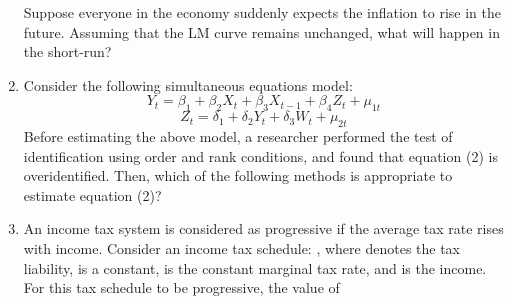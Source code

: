 \documentclass[12pt]{article}
\theoremstyle{remark}
\begin{document}
\begin{enumerate}
Suppose everyone in the economy suddenly expects the inflation to rise in the future. Assuming that the LM curve remains unchanged, what will happen in the short-run? \\
\begin{enumerate}  \end{enumerate}
\hfill{}
\item Consider the following simultaneous equations model:
$$
Y_t = \beta_1 + \beta_2 X_t + \beta_3 X_{t-1} + \beta_4 Z_t + \mu_{1t} 
$$
$$
Z_t = \delta_1 + \delta_2 Y_t + \delta_3 W_t + \mu_{2t} 
$$
Before estimating the above model, a researcher performed the test of identification using order and rank conditions, and found that equation (2) is overidentified. Then, which of the following methods is appropriate to estimate equation (2)? \\
\begin{enumerate}  \end{enumerate}
\hfill{}
\item  An income tax system is considered as progressive if the average tax rate rises with income. Consider an income tax schedule: 
, where  denotes the tax liability,  is a constant,  is the constant marginal tax rate, and  is the income. For this tax schedule to be progressive, the value of  \\
\begin{enumerate} 
\end{enumerate}
\end{enumerate}
\end{document}
